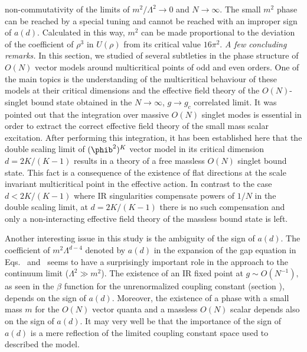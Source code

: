 non-commutativity of the limits of $m^2/\Lambda^2 \to 0 $ and $ N \to \infty$.
The small  $m^2$ phase can be reached by a special tuning  and
cannot be reached with an improper sign of $a(d)$.
Calculated in this way, $m^2$ can be made proportional to the deviation  of
the  coefficient of $\rho^3$ in $U(\rho)$ from its critical  value $16\pi^2$.
%
\medskip
{\it A few concluding remarks.}
In this section, we studied of several subtleties in the phase structure of  $O(N)$ vector
models around multicritical points of odd and even orders.
One of the main topics is the understanding of the multicritical behaviour
of these models  at their critical dimensions and the effective field theory
of the $O(N)$-singlet bound state obtained in the $N \to \infty$,  $g \to g_c$
correlated limit. It was pointed out that the integration over massive $O(N)$ singlet modes is essential in order to extract the correct effective field theory of the small mass scalar excitation.
After performing this integration, it has been established here that
the double scaling limit of $(\phib^2)^K$ vector model
in its critical dimension $d=2K/(K-1)$
results in a theory of a free massless $O(N)$ singlet bound state.
This fact is a consequence of the existence of
flat directions at the scale invariant multicritical point in the effective action. In contrast to the case $d < 2K/(K-1)$
where IR singularities compensate powers of $1/N$ in the double scaling
limit,  at  $d=2K/(K-1)$ there is no such compensation and only a
non-interacting effective field theory  of the massless bound state is left.
\par
Another interesting issue in this study is the ambiguity of the
sign of $a(d)$.
The coefficient of $m^2\Lambda^{d-4}$ denoted by $a(d)$ in the expansion
of the gap equation in Eqs.~ and \edmum\ seems to have a
surprisingly important role in the approach to the continuum limit ($\Lambda^2
\gg m^2$). The existence of an IR fixed point  at $g \sim O(N^{-1}),$ as seen
in the $\beta$ function for the unrenormalized coupling constant (section
\sssEGRN), depends on the sign of $a(d)$. Moreover, %
the existence of a phase with a small mass $m$ for the $O(N)$ vector quanta
and a massless $O(N)$ scalar depends also on the sign of
$a(d)$. It may very well be that the importance of
the sign of $a(d)$ is a mere reflection of the limited  coupling constant
space used to described the model.
%
